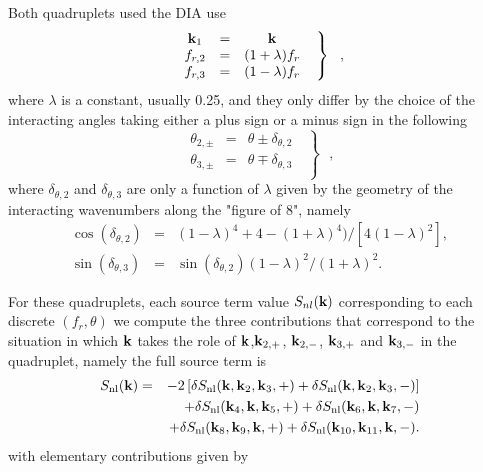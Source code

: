 Both quadruplets used the DIA use 
\begin{equation} \left .
\begin{array}{ccc}
  \mbox{\bf k}_1 & = & \mbox{\bf k}\\
  f_{r,2}  & = & (1+\lambda)f_{r}    \\
  f_{r,3}  & = & (1-\lambda)f_{r} 
\end{array} \:\:\: \right \rbrace \:\:\: , \label{eq:DIAchoice}
\end{equation}
where $\lambda$ is a constant, usually 0.25, and they only differ by the choice of the interacting angles 
taking either a plus sign or a minus sign in the following 
\begin{equation} \left .
\begin{array}{ccc}
  \theta_{2,\pm}  & = & \theta \pm \delta_{\theta,2}   \\
 \theta_{3,\pm}  & = & \theta \mp  \delta_{\theta,3}   \\
 \end{array} \:\:\: \right \rbrace \:\:\: , \label{eq:DIAangles}
\end{equation}
where $\delta_{\theta,2}$ and $\delta_{\theta,3}$ are only a function of $\lambda$ given by the geometry of
the interacting wavenumbers along the "figure of 8", namely  
\begin{eqnarray}
\cos(\delta_{\theta,2})&=&(1-\lambda)^4+4-(1+\lambda)^4)/[4(1-\lambda)^2], \\
\sin(\delta_{\theta,3})&=&\sin(\delta_{\theta,2}) (1-\lambda)^2/(1+\lambda)^2.
\end{eqnarray}

 For these quadruplets, each source term value
$S_{nl}(\mbox{\bf k})$ corresponding to each discrete $(f_r,\theta)$
we compute the three contributions that correspond to the situation in which $\mbox{\bf k}$ takes the role of $\mbox{\bf k}$,$\mbox{\bf k}_{2,+}$, $\mbox{\bf k}_{2,-}$, $\mbox{\bf k}_{3,+}$  and $\mbox{\bf k}_{3,-}$ in the quadruplet, namely the full source term is 
\begin{eqnarray} 
S_{\mathrm{nl}}(\mbox{\bf k}) &=& -2  \left[\delta S_{\mathrm{nl}}(\mbox{\bf k},\mbox{\bf k}_2,\mbox{\bf k}_3,+)+\delta S_{\mathrm{nl}}(\mbox{\bf k},\mbox{\bf k}_2,\mbox{\bf k}_3,-)\right] \nonumber  \\
 & & + \delta  S_{\mathrm{nl}}(\mbox{\bf k}_4,\mbox{\bf k},\mbox{\bf k}_5,+) + \delta  S_{\mathrm{nl}}(\mbox{\bf k}_6,\mbox{\bf k},\mbox{\bf k}_7,-)  \\
     & &        +   \delta S_{\mathrm{nl}}(\mbox{\bf k}_8,\mbox{\bf k}_9,\mbox{\bf k}, +) + \delta S_{\mathrm{nl}}(\mbox{\bf k}_{10},\mbox{\bf k}_{11},\mbox{\bf k}, -) . \label{eq:diasum}
\end{eqnarray}
with elementary contributions given by  

